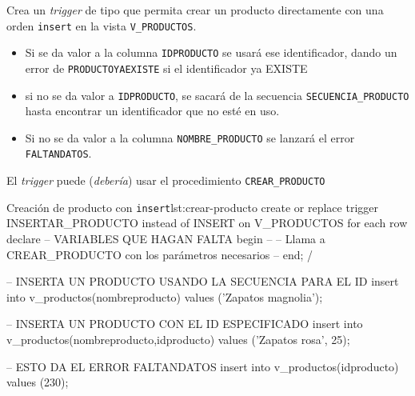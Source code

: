 \newpage

\begin{homeworkProblem}

  Crea un \textit{trigger} de tipo  que permita crear un producto directamente con una orden \texttt{insert} en la vista \texttt{V\_PRODUCTOS}.
  \begin{itemize}
  \item Si se da valor a la columna \texttt{IDPRODUCTO} se usará ese identificador, dando un error de \texttt{PRODUCTOYAEXISTE} si el identificador ya EXISTE
  \item si no se da valor a \texttt{IDPRODUCTO}, se sacará de la secuencia \texttt{SECUENCIA\_PRODUCTO} hasta encontrar un identificador que no esté en uso.
  \item Si no se da valor a la columna \texttt{NOMBRE\_PRODUCTO} se lanzará el error \texttt{FALTANDATOS}.
  \end{itemize}

  \begin{Aviso}
    El \textit{trigger} puede (\textit{debería}) usar el procedimiento \texttt{CREAR\_PRODUCTO}
  \end{Aviso}
  
  
\begin{listadosql}{Creación de producto con \texttt{insert}}{lst:crear-producto}
create or replace trigger INSERTAR_PRODUCTO
instead of INSERT on V_PRODUCTOS
for each row
declare
  -- VARIABLES QUE HAGAN FALTA
begin
  -- 
  -- Llama a CREAR_PRODUCTO con los parámetros necesarios
  -- 
end;
/


-- INSERTA UN PRODUCTO USANDO LA SECUENCIA PARA EL ID
insert into v_productos(nombreproducto) values ('Zapatos magnolia');

-- INSERTA UN PRODUCTO CON EL ID ESPECIFICADO
insert into v_productos(nombreproducto,idproducto) values ('Zapatos rosa', 25);

-- ESTO DA EL ERROR FALTANDATOS
insert into v_productos(idproducto) values (230);


\end{listadosql}

\end{homeworkProblem}



